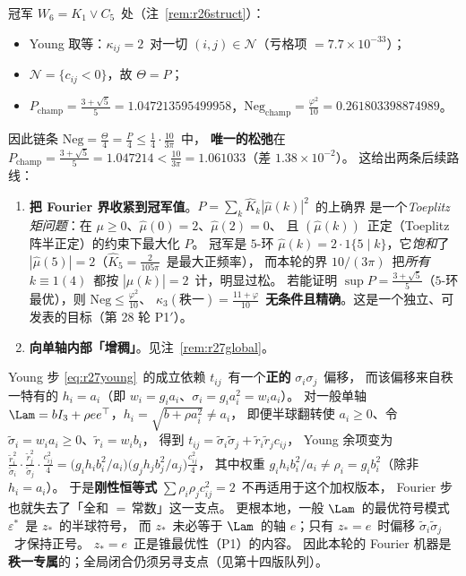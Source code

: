 冠军 $W_6=K_1\vee C_5$~处（注~\ref{rem:r26struct}）：
\begin{itemize}\itemsep=1pt
\item Young 取等：$\kappa_{ij}=2$~对一切 $(i,j)\in\mathcal N$（亏格项 $=7.7\times10^{-33}$）；
\item $\mathcal N=\{c_{ij}<0\}$，故 $\Theta=P$；
\item $P_{\text{champ}}=\frac{3+\sqrt5}5=1.047213595499958$，$\mathrm{Neg}_{\text{champ}}=\frac{\varphi^2}{10}=0.261803398874989$。
\end{itemize}
因此链条 $\mathrm{Neg}=\frac\Theta4=\frac P4\le\frac14\cdot\frac{10}{3\pi}$~中，
\textbf{唯一的松弛}在 $P_{\text{champ}}=\frac{3+\sqrt5}5=1.047214<\frac{10}{3\pi}=1.061033$（差 $1.38\times10^{-2}$）。
这给出两条后续路线：
\begin{enumerate}\itemsep=1pt
\item[\textbf{(i)}]\textbf{把 Fourier 界收紧到冠军值}。$P=\sum_k\widehat K_k|\widehat\mu(k)|^2$~的上确界
是一个\emph{Toeplitz 矩问题}：在 $\mu\ge0$、$\widehat\mu(0)=2$、$\widehat\mu(2)=0$、
且 $(\widehat\mu(k))$~正定（Toeplitz 阵半正定）的约束下最大化 $P$。
冠军是 $5$-环 $\widehat\mu(k)=2\cdot1\{5\mid k\}$，它\emph{饱和}了 $|\widehat\mu(5)|=2$（$\widehat K_5=\frac2{105\pi}$~是最大正频率），
而本轮的界 $10/(3\pi)$~把\emph{所有} $k\equiv1(4)$~都按 $|\widehat\mu(k)|=2$~计，明显过松。
若能证明 $\sup P=\frac{3+\sqrt5}5$（$5$-环最优），则 $\mathrm{Neg}\le\frac{\varphi^2}{10}$、
$\kappa_3(\text{秩一})=\frac{11+\varphi}{10}$~\textbf{无条件且精确}。这是一个独立、可发表的目标（第 28 轮 P1$'$）。
\item[\textbf{(ii)}]\textbf{向单轴内部「增稠」}。见注~\ref{rem:r27global}。
\end{enumerate}

\begin{remark}\label{rem:r27global}
Young 步 \eqref{eq:r27young}~的成立依赖 $t_{ij}$~有一个\textbf{正的} $\sigma_i\sigma_j$~偏移，
而该偏移来自秩一特有的 $h_i=a_i$（即 $w_i=g_ia_i$、$\sigma_i=g_ia_i^2=w_ia_i$）。
对一般单轴 $\Lam=bI_3+\rho ee^\top$，$h_i=\sqrt{b+\rho a_i^2}\ne a_i$，
即便半球翻转使 $a_i\ge0$、令 $\widetilde\sigma_i=w_ia_i\ge0$、$\widetilde r_i=w_ib_i$，
得到 $t_{ij}=\widetilde\sigma_i\widetilde\sigma_j+\widetilde r_i\widetilde r_jc_{ij}$，
Young 余项变为 $\frac{\widetilde r_i^2}{\widetilde\sigma_i}\cdot\frac{\widetilde r_j^2}{\widetilde\sigma_j}\cdot\frac{c_{ij}^2}4
=\bigl(g_ih_ib_i^2/a_i\bigr)\bigl(g_jh_jb_j^2/a_j\bigr)\frac{c_{ij}^2}4$，
其中权重 $g_ih_ib_i^2/a_i\ne\rho_i=g_ib_i^2$（除非 $h_i=a_i$）。
于是\textbf{刚性恒等式} $\sum\rho_i\rho_jc_{ij}^2=2$~不再适用于这个加权版本，
Fourier 步也就失去了「全和 $=$\,常数」这一支点。
更根本地，一般 $\Lam$~的最优符号模式 $\varepsilon^*$~是 $z_*$~的半球符号，
而 $z_*$~未必等于 $\Lam$~的轴 $e$；只有 $z_*=e$~时偏移 $\widetilde\sigma_i\widetilde\sigma_j$~才保持正号。
$z_*=e$~正是锥最优性（P1）的内容。
因此本轮的 Fourier 机器是\textbf{秩一专属}的；全局闭合仍须另寻支点（见第十四版队列）。
\end{remark}

